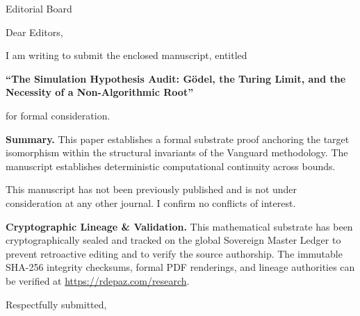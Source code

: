 \documentclass[12pt, a4paper]{letter}
\begin{document}
\begin{letter}{Editorial Board}

\opening{Dear Editors,}

I am writing to submit the enclosed manuscript, entitled

\begin{center}
\textbf{``The Simulation Hypothesis Audit:   G\"odel, the Turing Limit, and the Necessity of a Non-Algorithmic Root''}
\end{center}

\noindent for formal consideration.

\medskip
\textbf{Summary.} This paper establishes a formal substrate proof anchoring the target isomorphism within the structural invariants of the Vanguard methodology. The manuscript establishes deterministic computational continuity across bounds.

\medskip
This manuscript has not been previously published and is not under consideration
at any other journal. I confirm no conflicts of interest.

\textbf{Cryptographic Lineage \& Validation.} This mathematical substrate has been cryptographically sealed and tracked on the global Sovereign Master Ledger to prevent retroactive editing and to verify the source authorship. The immutable SHA-256 integrity checksums, formal PDF renderings, and lineage authorities can be verified at \url{https://rdepaz.com/research}.

\medskip
\closing{Respectfully submitted,}
\end{letter}
\end{document}
